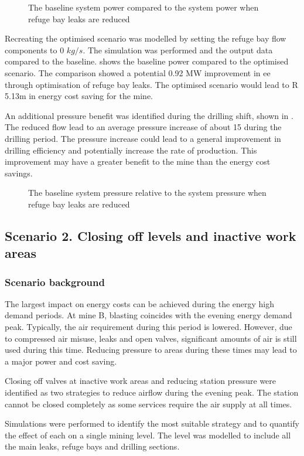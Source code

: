 	\par 
	\begin{figure}[h!]
		\centering
		
		\caption{The baseline system power compared to the system power when refuge bay leaks are reduced}
		\label{fig: RefugeBay Power.}
	\end{figure} 
	Recreating the optimised scenario was modelled by setting the refuge bay flow components to 0 $kg/s$. The simulation was performed and the output data compared to the baseline.  shows the baseline power compared to the optimised scenario. The comparison showed a potential 0.92 MW improvement in \gls{ee} through optimisation of refuge bay leaks. The optimised scenario would lead to R 5.13m in energy cost saving for the mine.
	\par
	An additional pressure benefit was identified during the drilling shift, shown in . The reduced flow lead to an average pressure increase of about 15  during the drilling period. The pressure increase could lead to a general improvement in drilling efficiency and potentially increase the rate of production. This improvement may have a greater benefit to the mine than the energy cost savings.
	\begin{figure}[h!]
		\centering
		
		\caption{The baseline system pressure relative to the system pressure when refuge bay leaks are reduced}
		\label{fig: RefugeBay Pressures.}
	\end{figure} 
	\subsection{Scenario 2. Closing off levels and inactive work areas}
	\subsubsection{Scenario background}
	The largest impact on energy costs can be achieved during the energy high demand periods. At mine B, blasting coincides with the evening energy demand peak. Typically, the air requirement during this period is lowered. However, due to compressed air misuse, leaks and open valves, significant amounts of air is still used during this time. Reducing pressure to areas during these times may lead to a major power and cost saving. 
	\par 
	Closing off valves at inactive work areas and reducing station pressure were identified as two strategies to reduce airflow during the evening peak. The station cannot be closed completely as some services require the air supply at all times. 
	\par 
	Simulations were performed to identify the most suitable strategy and to quantify the effect of each on a single mining level. The level was modelled to include all the main leaks, refuge bays and drilling sections.  
